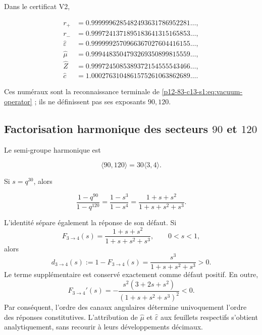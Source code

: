 Dans le certificat V2,

\begin{align*}
r_+&=0.9999996285482493631786952281\ldots,\\
r_-&=0.9997241371895183641315165853\ldots,\\
\widehat\varepsilon&=0.9999992570966367027604416155\ldots,\\
\widehat\mu&=0.9994483504793269350899815559\ldots,\\
\widehat Z&=0.9997245085389372154555543466\ldots,\\
\widehat c&=1.0002763104861575261063862689\ldots.
\end{align*}

Ces numéraux sont la reconnaissance terminale de \cref{p12-83-c13-s1:eq:vacuum-operator} ; ils ne définissent pas ses exposants \(90,120\).

\subsection{Factorisation harmonique des secteurs \texorpdfstring{\(90\)}{90} et \texorpdfstring{\(120\)}{120}}

Le semi-groupe harmonique est

\[
\langle90,120\rangle=30\langle3,4\rangle.
\]

Si \(s=q^{30}\), alors

\begin{equation}
\frac{1-q^{90}}{1-q^{120}}
=\frac{1-s^3}{1-s^4}
=\frac{1+s+s^2}{1+s+s^2+s^3}.
\label{p12-83-c13-s1:eq:three-four-completion}
\end{equation}

L'identité sépare également la réponse de son défaut. Si
\[
F_{3\to4}(s)=\frac{1+s+s^2}{1+s+s^2+s^3},
\qquad 0<s<1,
\]
alors
\begin{equation}
d_{3\to4}(s):=1-F_{3\to4}(s)
=\frac{s^3}{1+s+s^2+s^3}>0.
\label{p12-83-c13-s1:eq:vacuum-defect34}
\end{equation}
Le terme supplémentaire est conservé exactement comme défaut
positif. En outre,
\begin{equation}
F_{3\to4}'(s)
=-\frac{s^2(3+2s+s^2)}{(1+s+s^2+s^3)^2}<0.
\label{p12-83-c13-s1:eq:vacuum-monotonic34}
\end{equation}
Par conséquent, l'ordre des canaux angulaires détermine univoquement
l'ordre des réponses constitutives. L'attribution de
\(\widehat\mu\) et \(\widehat\varepsilon\) aux feuillets respectifs s'obtient
analytiquement, sans recourir à leurs développements décimaux.

